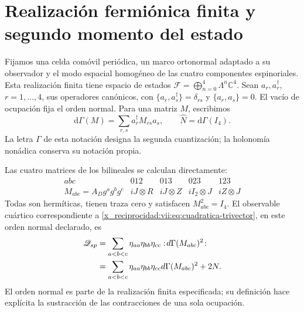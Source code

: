 \section{Realización fermiónica finita y segundo momento del estado}
\label{x_reciprocidad:vii:subsec:segundo-momento-car}

Fijamos una celda comóvil periódica, un marco ortonormal adaptado a su
observador y el modo espacial homogéneo de las cuatro componentes
espinoriales. Esta realización finita tiene espacio de estados
\(\mathcal F=\bigoplus_{n=0}^4\Lambda^n\mathbb C^4\).
Sean \(a_r,a_r^\dagger\), \(r=1,\ldots,4\), sus operadores
canónicos, con
\(\{a_r,a_s^\dagger\}=\delta_{rs}\) y
\(\{a_r,a_s\}=0\). El vacío de ocupación fija el orden
normal. Para una matriz \(M\), escribimos
\[
 \mathrm d\Gamma(M)=\sum_{r,s}a_r^\dagger M_{rs}a_s,
 \qquad \widehat N=\mathrm d\Gamma(I_4).
\]
La letra \(\Gamma\) de esta notación designa la segunda
cuantización; la holonomía nonádica conserva su notación propia.

Las cuatro matrices de los bilineales se calculan directamente:
\begin{equation}
 \begin{array}{c|cccc}
 abc&012&013&023&123\\ \hline
 M_{abc}=A_Dg^ag^bg^c
       &iJ\otimes R&iJ\otimes Z&iI_2\otimes J&iZ\otimes J
 \end{array}
 \label{x_reciprocidad:vii:eq:matrices-bilineales-espin}
\end{equation}
Todas son hermíticas, tienen traza cero y satisfacen
\(M_{abc}^2=I_4\). El observable cuártico correspondiente a
\eqref{x_reciprocidad:vii:eq:cuadratica-trivector}, en este orden normal declarado,
es
\begin{equation}
 \begin{split}
 \widehat{\mathscr Q}_{\rm sp}
 &=\sum_{a<b<c}\eta_{aa}\eta_{bb}\eta_{cc}
       :\!\mathrm d\Gamma(M_{abc})^2\!:\\
 &=\sum_{a<b<c}\eta_{aa}\eta_{bb}\eta_{cc}
       \mathrm d\Gamma(M_{abc})^2+2\widehat N.
 \end{split}
 \label{x_reciprocidad:vii:eq:observable-cuadratico-espin}
\end{equation}
El orden normal es parte de la realización finita especificada;
su definición hace explícita la sustracción de las contracciones de
una sola ocupación.

